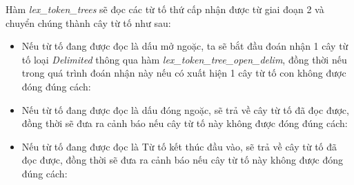 Hàm \textit{lex\_token\_trees} sẽ đọc các từ tố thứ cấp nhận được từ giai đoạn 2 và chuyển chúng thành cây từ tố như sau:

\begin{itemize}
  \item Nếu từ tố đang được đọc là dấu mở ngoặc, ta sẽ bắt đầu đoán nhận 1 cây từ tố loại \textit{Delimited} thông qua hàm \textit{lex\_token\_tree\_open\_delim}, đồng thời nếu trong quá trình đoán nhận này nếu có xuất hiện 1 cây từ tố con không được đóng đúng cách:
  
              
  
  \item Nếu từ tố đang được đọc là dấu đóng ngoặc, sẽ trả về cây từ tố đã đọc được, đồng thời sẽ đưa ra cảnh báo nếu cây từ tố này không được đóng đúng cách:
  
              
              
  
  \item Nếu từ tố đang được đọc là Từ tố kết thúc đầu vào, sẽ trả về cây từ tố đã đọc được, đồng thời sẽ đưa ra cảnh báo nếu cây từ tố này không được đóng đúng cách:
  

\end{itemize}
